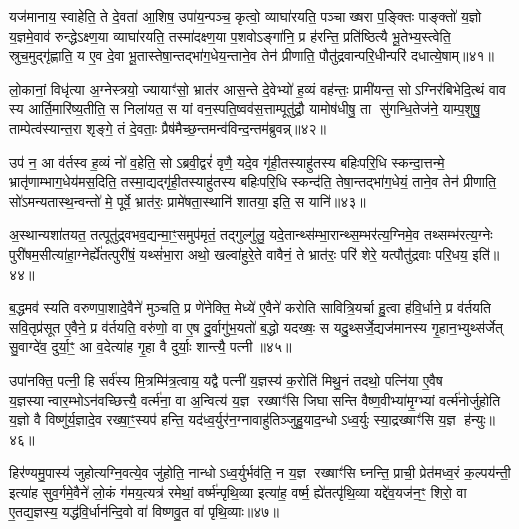 यज॑मानाय॒ स्वाहेति॒ ते दे॒वता॑ आ॒शिष॒ उपा॑य॒न्पञ्च॒ कृत्वो॒ व्याघा॑रयति॒ पञ्चाख्षरा प॒ङ्क्तिः पाङ्क्तो॑ य॒ज्ञो य॒ज्ञमे॒वाव॑ रुन्द्धेऽक्ष्ण॒या व्याघा॑रयति॒ तस्मा॑दक्ष्ण॒या प॒शवोऽङ्गा॑नि॒ प्र ह॑रन्ति॒ प्रति॑ष्ठित्यै भू॒तेभ्य॒स्त्वेति॒ स्रुच॒मुद्गृ॑ह्णाति॒ य ए॒व दे॒वा भू॒तास्तेषा॒न्तद्भा॑ग॒धेय॒न्ताने॒व तेन॑ प्रीणाति॒ पौतु॑द्रवान्परि॒धीन्परि॑ दधात्ये॒षाम्॥४१॥

लो॒कानां॒ विधृ॑त्या अ॒ग्नेस्त्रयो॒ ज्यायाꣳ॑सो॒ भ्रात॑र आस॒न्ते दे॒वेभ्यो॑ ह॒व्यं वह॑न्तः॒ प्रामी॑यन्त॒ सोऽग्निर॑बिभेदि॒त्थं वाव स्य आर्ति॒मारि॑ष्य॒तीति॒ स निला॑यत॒ स यां वन॒स्पति॒ष्वव॑स॒त्ताम्पूतु॑द्रौ॒ यामोष॑धीषु॒ ता सु॑गन्धि॒तेज॑ने॒ याम्प॒शुषु॒ ताम्पेत्व॑स्यान्त॒रा शृङ्गे॒ तं दे॒वताः॒ प्रैष॑मैच्छ॒न्तमन्व॑विन्द॒न्तम॑ब्रुवन्न्॥४२॥

उप॑ न॒ आ व॑र्तस्व ह॒व्यं नो॑ व॒हेति॒ सोऽब्रवी॒द्वरं॑ वृणै॒ यदे॒व गृ॑ही॒तस्याहु॑तस्य बहिःपरि॒धि स्कन्दा॒त्तन्मे॒ भ्रातृ॑णाम्भाग॒धेय॑मस॒दिति॒ तस्मा॒द्यद्गृ॑ही॒तस्याहु॑तस्य बहिःपरि॒धि स्कन्द॑ति॒ तेषा॒न्तद्भा॑ग॒धेयं॒ ताने॒व तेन॑ प्रीणाति॒ सो॑ऽमन्यतास्थ॒न्वन्तो॑ मे॒ पूर्वे॒ भ्रात॑रः॒ प्रामे॑षता॒स्थानि॑ शातया॒ इति॒ स यानि॑॥४३॥

अ॒स्थान्यशा॑तयत॒ तत्पूतु॑द्र्वभव॒द्यन्मा॒ꣳ॒समुप॑मृतं॒ तद्गुल्गु॑लु॒ यदे॒तान्थ्स॑म्भा॒रान्थ्स॒म्भर॑त्य॒ग्निमे॒व तथ्सम्भ॑रत्य॒ग्नेः पुरी॑षम॒सीत्या॑हा॒ग्नेर्\mbox{}ह्ये॑तत्पुरी॑षं॒ यथ्सं॑भा॒रा अथो॒ खल्वा॑हुरे॒ते वावैनं॒ ते भ्रात॑रः॒ परि॑ शेरे॒ यत्पौतु॑द्रवाः परि॒धय॒ इति॑॥४४॥

{\anuvakamend[{वि॒त्त्वा दे॑वय॒त ए॒षाम॑ब्रुव॒न् यानि॒ चतु॑श्चत्वारिशच्च॥८॥}]}

ब॒द्धमव॑ स्यति वरुणपा॒शादे॒वैने॑ मुञ्चति॒ प्र णे॑नेक्ति॒ मेध्ये॑ ए॒वैने॑ करोति सावित्रि॒यर्चा हु॒त्वा ह॑वि॒र्धाने॒ प्र व॑र्तयति सवि॒तृप्र॑सूत ए॒वैने॒ प्र व॑र्तयति॒ वरु॑णो॒ वा ए॒ष दु॒र्वागु॑भ॒यतो॑ ब॒द्धो यदख्षः॒ स यदु॒थ्सर्जे॒द्यज॑मानस्य गृ॒हान॒भ्युथ्स॑र्जेत् सु॒वाग्दे॑व॒ दुर्या॒ꣳ॒ आ व॒देत्या॑ह गृ॒हा वै दुर्याः॒ शान्त्यै॒ पत्नी॥४५॥

उपा॑नक्ति॒ पत्नी॒ हि सर्व॑स्य मि॒त्रम्मि॑त्र॒त्वाय॒ यद्वै पत्नी॑ य॒ज्ञस्य॑ क॒रोति॑ मिथु॒नं तदथो॒ पत्नि॑या ए॒वैष य॒ज्ञस्यान्वार॒म्भोऽन॑वच्छित्त्यै॒ वर्त्म॑ना॒ वा अ॒न्वित्य॑ य॒ज्ञ रख्षाꣳ॑सि जिघासन्ति वैष्ण॒वीभ्या॑मृ॒ग्भ्यां वर्त्म॑नोर्जुहोति य॒ज्ञो वै विष्णु॑र्य॒ज्ञादे॒व रख्षा॒ꣳ॒स्यप॑ हन्ति॒ यद॑ध्व॒र्युर॑न॒ग्नावाहु॑तिञ्जुहु॒याद॒न्धोऽध्व॒र्युः स्या॒द्रख्षाꣳ॑सि य॒ज्ञ ह॑न्युः॥४६॥

हिर॑ण्यमु॒पास्य॑ जुहोत्यग्नि॒वत्ये॒व जु॑होति॒ नान्धोऽध्व॒र्युर्भव॑ति॒ न य॒ज्ञ रख्षाꣳ॑सि घ्नन्ति॒ प्राची॒ प्रेत॑मध्व॒रं क॒ल्पय॑न्ती॒ इत्या॑ह सुव॒र्गमे॒वैने॑ लो॒कं ग॑मय॒त्यत्र॑ रमेथां॒ वर्ष्म॑न्पृथि॒व्या इत्या॑ह॒ वर्ष्म॒ ह्ये॑तत्पृ॑थि॒व्या यद्दे॑व॒यज॑न॒ꣳ॒ शिरो॒ वा ए॒तद्य॒ज्ञस्य॒ यद्ध॑वि॒र्धान॑न्दि॒वो वा॑ विष्णवु॒त वा॑ पृथि॒व्याः॥४७॥

